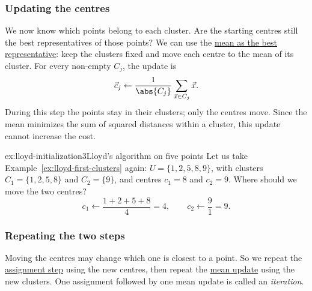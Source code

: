 \documentclass[a4paper,12pt,oneside]{report}
\begin{document}
\subsubsection{Updating the centres}
\label{sec:lloyd-update}

We now know which points belong to each cluster. Are the starting
centres still the best representatives of those points? We can use
the \hyperref[prop:k-means-one]{mean as the best representative}:
keep the clusters fixed and move each centre to the mean of its
cluster. For every non-empty $C_j$, the update is
\[
  \vec c_j\gets\frac{1}{\abs{C_j}}\sum_{\vec x\in C_j}\vec x.
\]
During this step the points stay in their clusters; only the centres
move. Since the mean minimizes the sum of squared distances within a
cluster, this update cannot increase the cost.

\begin{framedexamplepart}{ex:lloyd-initialization}{3}{Lloyd's algorithm on five points}
\label{ex:lloyd-updated-centres}
Let us take Example~\ref{ex:lloyd-first-clusters} again:
$U=\{1,2,5,8,9\}$, with clusters $C_1=\{1,2,5,8\}$ and
$C_2=\{9\}$, and centres $c_1=8$ and $c_2=9$.
Where should we move the two centres?
\[
  c_1\gets\frac{1+2+5+8}{4}=4,\qquad
  c_2\gets\frac91=9.
\]
\begin{center}
\end{center}
\end{framedexamplepart}

\subsubsection{Repeating the two steps}
\label{sec:lloyd-repeat}

Moving the centres may change which one is closest to a point. So we
repeat the \hyperref[sec:lloyd-assignment]{assignment step} using the
new centres, then repeat the
\hyperref[sec:lloyd-update]{mean update} using the new clusters.
One assignment followed by one mean update is called an
\emph{iteration}.
\end{document}
